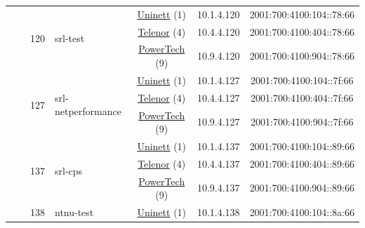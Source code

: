 \begin{small}
\begin{center}
\begin{longtable}{|c|c|c|c|c|c|c|c|}
  &  & \multirow{3}{*}{\tiny{120}} & \multicolumn{1}{|l|}{\multirow{3}{*}{\tiny{srl-test}}} & \multicolumn{2}{|c|}{\tiny{\href{https://www.uninett.no}{Uninett} (1)}} & \tiny{10.1.4.120} & \tiny{2001:700:4100:104::78:66} \\* \cline{5-5}\cline{6-6}\cline{7-7}\cline{8-8}
  &  &  &  & \multicolumn{2}{|c|}{\tiny{\href{https://www.telenor.no}{Telenor} (4)}} & \tiny{10.4.4.120} & \tiny{2001:700:4100:404::78:66} \\* \cline{5-5}\cline{6-6}\cline{7-7}\cline{8-8}
  &  &  &  & \multicolumn{2}{|c|}{\tiny{\href{http://www.powertech.no}{PowerTech} (9)}} & \tiny{10.9.4.120} & \tiny{2001:700:4100:904::78:66} \\* \cline{3-3}\cline{4-4}\cline{5-5}\cline{6-6}\cline{7-7}\cline{8-8}
  &  & \multirow{3}{*}{\tiny{127}} & \multicolumn{1}{|l|}{\multirow{3}{*}{\tiny{srl-netperformance}}} & \multicolumn{2}{|c|}{\tiny{\href{https://www.uninett.no}{Uninett} (1)}} & \tiny{10.1.4.127} & \tiny{2001:700:4100:104::7f:66} \\* \cline{5-5}\cline{6-6}\cline{7-7}\cline{8-8}
  &  &  &  & \multicolumn{2}{|c|}{\tiny{\href{https://www.telenor.no}{Telenor} (4)}} & \tiny{10.4.4.127} & \tiny{2001:700:4100:404::7f:66} \\* \cline{5-5}\cline{6-6}\cline{7-7}\cline{8-8}
  &  &  &  & \multicolumn{2}{|c|}{\tiny{\href{http://www.powertech.no}{PowerTech} (9)}} & \tiny{10.9.4.127} & \tiny{2001:700:4100:904::7f:66} \\* \cline{3-3}\cline{4-4}\cline{5-5}\cline{6-6}\cline{7-7}\cline{8-8}
  &  & \multirow{3}{*}{\tiny{137}} & \multicolumn{1}{|l|}{\multirow{3}{*}{\tiny{srl-cps}}} & \multicolumn{2}{|c|}{\tiny{\href{https://www.uninett.no}{Uninett} (1)}} & \tiny{10.1.4.137} & \tiny{2001:700:4100:104::89:66} \\* \cline{5-5}\cline{6-6}\cline{7-7}\cline{8-8}
  &  &  &  & \multicolumn{2}{|c|}{\tiny{\href{https://www.telenor.no}{Telenor} (4)}} & \tiny{10.4.4.137} & \tiny{2001:700:4100:404::89:66} \\* \cline{5-5}\cline{6-6}\cline{7-7}\cline{8-8}
  &  &  &  & \multicolumn{2}{|c|}{\tiny{\href{http://www.powertech.no}{PowerTech} (9)}} & \tiny{10.9.4.137} & \tiny{2001:700:4100:904::89:66} \\* \cline{3-3}\cline{4-4}\cline{5-5}\cline{6-6}\cline{7-7}\cline{8-8}
  &  & \multirow{3}{*}{\tiny{138}} & \multicolumn{1}{|l|}{\multirow{3}{*}{\tiny{ntnu-test}}} & \multicolumn{2}{|c|}{\tiny{\href{https://www.uninett.no}{Uninett} (1)}} & \tiny{10.1.4.138} & \tiny{2001:700:4100:104::8a:66} \\* \cline{5-5}\cline{6-6}\cline{7-7}\cline{8-8}

\end{longtable}
\end{center}
\end{small}
